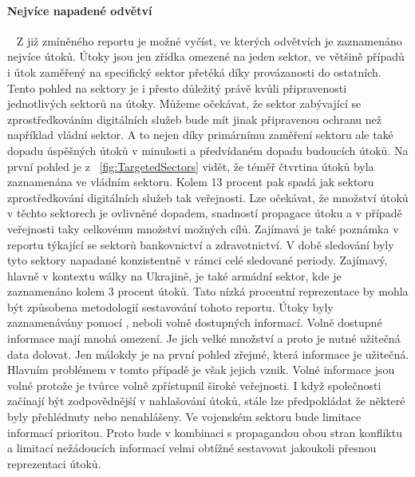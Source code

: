 \paragraph{Nejvíce napadené odvětví}
~\label{fig:TargetedSectors}
Z již zmíněného reportu\cite{Enisa_thread_landscape} je možné vyčíst, ve kterých odvětvích je zaznamenáno nejvíce útoků.
Útoky jsou jen zřídka omezené na jeden sektor, ve většině případů i útok zaměřený na specifický sektor přetéká díky provázanosti do ostatních.
Tento pohled na sektory je i přesto důležitý právě kvůli připravenosti jednotlivých sektorů na útoky.
Můžeme očekávat, že sektor zabývající se zprostředkováním digitálních služeb bude mít jinak připravenou ochranu než například vládní sektor.
A to nejen díky primárnímu zaměření sektoru ale také dopadu úspěšných útoků v minulosti a předvídaném dopadu budoucích útoků.
Na první pohled je z ~\ref{fig:TargetedSectors} vidět, že téměř čtvrtina útoků byla zaznamenána ve vládním sektoru.
Kolem 13 procent pak spadá jak sektoru zprostředkování digitálních služeb tak veřejnosti.
Lze očekávat, že množství útoků v těchto sektorech je ovlivněné dopadem, snadností propagace útoku a v případě veřejnosti taky celkovému množství možných cílů.
Zajímavá je také poznámka v reportu týkající se sektorů bankovnictví a zdravotnictví.
V době sledování byly tyto sektory napadané konzistentně v rámci celé sledované periody.
Zajímavý, hlavně v kontextu wálky na Ukrajině, je také armádní sektor, kde je zaznamenáno kolem 3 procent útoků.
Tato nízká procentní reprezentace by mohla být způsobena metodologií sestavování tohoto reportu.
Útoky byly zaznamenávány pomocí , neboli volně dostupných informací\cite{moje_bakalarka}.
Volně dostupné informace mají mnohá omezení.
Je jich velké množství a proto je nutné užitečná data dolovat.
Jen málokdy je na první pohled zřejmé, která informace je užitečná.
Hlavním problémem v tomto případě je však jejich vznik.
Volné informace jsou volné protože je tvůrce volně zpřístupnil široké veřejnosti.
I když společnosti začínají být zodpovědnější v nahlašování útoků, stále lze předpokládat že některé byly přehlédnuty nebo nenahlášeny.
Ve vojenském sektoru bude limitace informací prioritou.
Proto bude v kombinaci s propagandou obou stran konfliktu a limitací nežádoucích informací velmi obtížné sestavovat jakoukoli přesnou reprezentaci útoků.

